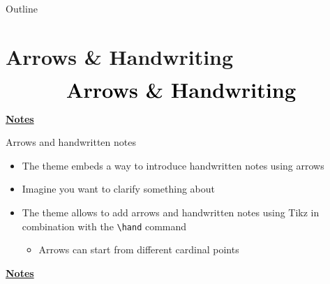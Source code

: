 \documentclass[10pt]{beamer}
\begin{document}
\begin{frame}{Outline}
    \tableofcontents[sections={2-}]
\end{frame}

\section{Arrows \& Handwriting}
\begin{frame}
    \begin{eqnarray*}
        &\text{{\huge \textbf{Arrows \& Handwriting}}}\\
    \end{eqnarray*}
\end{frame}
\begin{flushleft}
    \underline{\textbf{Notes}}\setlength{\parskip}{.15cm}\notesize\newline\par
\end{flushleft}

\begin{frame}[t]
    {Arrows and handwritten notes}\bigskip
    \begin{itemize}
        \item The theme embeds a way to introduce handwritten notes using arrows \bigskip\medskip
        \item Imagine you want to clarify something about  \bigskip\medskip\pause
        \item The theme allows to add arrows and handwritten notes using Tikz in combination with the \texttt{\textbackslash hand} command \medskip
        \begin{itemize}
            \item Arrows can start from different cardinal points 
        \end{itemize}
    \end{itemize}
\end{frame}
\begin{flushleft}
    \underline{\textbf{Notes}}\setlength{\parskip}{.15cm}\notesize\newline\par
\end{flushleft}
\end{document}
